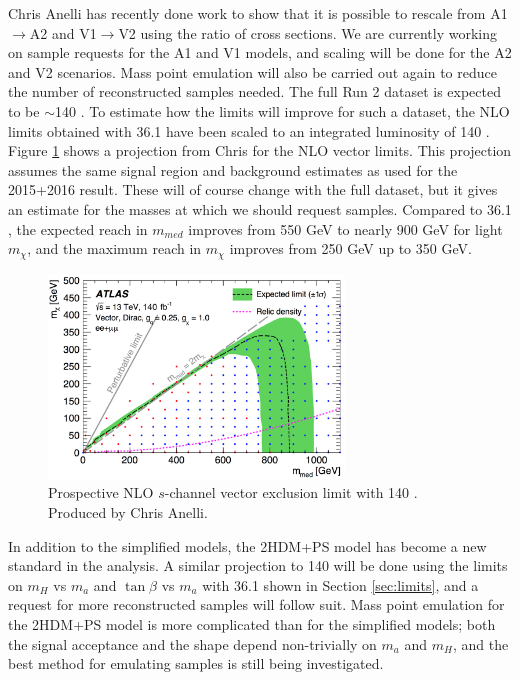 \noindent Chris Anelli has recently done work to show that it is possible to rescale from A1$\rightarrow$A2 and V1$\rightarrow$V2 using the ratio of cross sections. We are currently working on sample requests for the A1 and V1 models, and scaling will be done for the A2 and V2 scenarios. Mass point emulation will also be carried out again to reduce the number of reconstructed samples needed. The full Run 2 dataset is expected to be $\sim$140 \ifb. To estimate how the limits will improve for such a dataset, the NLO limits obtained with 36.1 \ifb have been scaled to an integrated luminosity of 140 \ifb. Figure \ref{fig:140limits} shows a projection from Chris for the NLO vector limits. This projection assumes the same signal region and background estimates as used for the 2015+2016 result. These will of course change with the full dataset, but it gives an estimate for the masses at which we should request samples. Compared to 36.1 \ifb, the expected reach in $m_{med}$ improves from 550 GeV to nearly 900 GeV for light $m_\chi$, and the maximum reach in $m_\chi$ improves from 250 GeV up to 350 GeV.

\begin{figure}[htb]
\centering
\includegraphics[width=0.7\textwidth]{Figures/140ifb.png}
\caption{Prospective NLO $s$-channel vector exclusion limit with 140 \ifb. Produced by Chris Anelli.}
\label{fig:140limits}
\end{figure}

In addition to the simplified models, the 2HDM+PS model has become a new standard in the analysis. A similar projection to 140 \ifb will be done using the limits on $m_H$ vs $m_a$ and $\tan \beta$ vs $m_a$ with 36.1 \ifb shown in Section \ref{sec:limits}, and a request for more reconstructed samples will follow suit. Mass point emulation for the 2HDM+PS model is more complicated than for the simplified models; both the signal acceptance and the \etmiss shape depend non-trivially on $m_a$ and $m_H$, and the best method for emulating samples is still being investigated.

